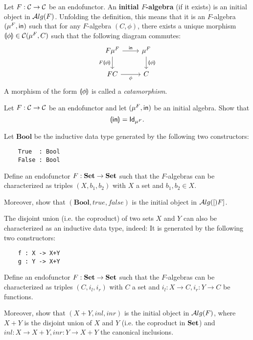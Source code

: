 \begin{dfn}\label{dfn:initial-alg}
  Let $F:\CC\to\CC$ be an endofunctor. An \textbf{initial $F$-algebra} (if it exists) is an initial object in $\ALG{F}$.
  Unfolding the definition, this means that it is an $F$-algebra $(\Initalg{F}, \In)$ such that for any $F$-algebra $(C,\phi)$, there exists a unique morphism $\catam{\phi} \in \CHom{\CC}{\Initalg{F}}{C}$ such that the following diagram commutes:
\begin{equation}\label{eq:initial-f-alg}
\begin{tikzcd}
{F\Initalg{F}} 
\arrow[r, "\In"] 
\arrow[d,swap, "F\catam{\phi}"]
& {\Initalg{F}} 
\arrow[d, "\catam{\phi}"] 
\\
FC
\arrow[r, swap, "\phi"] 
& C
\end{tikzcd}
\end{equation}
A morphism of the form $\catam{\phi}$ is called a \textit{catamorphism}.
\end{dfn}

\begin{exer}\label{exer:in_catamorphism_id}
  Let $F:\CC\to\CC$ be an endofunctor and let $(\Initalg F, \In)$ be an initial algebra. Show that
  \[\catam{\In} = \Id[\Initalg{F}].\]
\end{exer}

\begin{exer}\label{exer:bool_as_initial_algebra}
 Let $\mathbf{Bool}$ be the inductive data type generated by the following two constructors:
 \begin{lstlisting}
    True  : Bool
    False : Bool
  \end{lstlisting}
 Define an endofunctor $F:\SET\to \SET$ such that the $F$-algebras can be characterized as triples $(X, b_1, b_2)$ with $X$ a set and $b_1,b_2\in X$.
 
Moreover, show that $(\mathbf{Bool}, true, false)$ is the initial object in $\ALG[F]$.
\end{exer}

\begin{exer}\label{exer:coproduct_as_initial_algebra}
The disjoint union (i.e. the coproduct) of two sets $X$ and $Y$ can also be characterized as an inductive data type, indeed: It is generated by the following two constructors:
 \begin{lstlisting}
    f : X -> X+Y
    g : Y -> X+Y
  \end{lstlisting}
 Define an endofunctor $F:\SET\to \SET$ such that the $F$-algebras can be characterized as triples $(C, i_l, i_r)$ with $C$ a set and $i_l : X\to C, i_r : Y\to C$ be functions.
 
Moreover, show that $(X + Y, inl, inr)$ is the initial object in $\ALG{F}$, where $X+Y$ is the disjoint union of $X$ and $Y$ (i.e. the coproduct in $\SET$) and $inl:X\to X+Y, inr:Y\to X+Y$ the canonical inclusions.
\end{exer}

